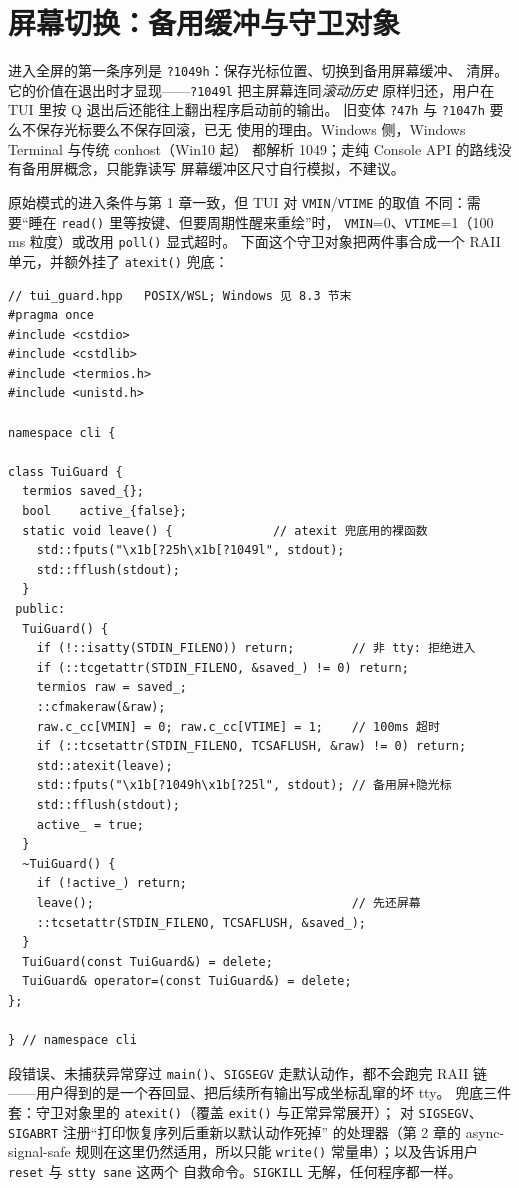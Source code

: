 \documentclass[12pt,a4paper,fontset=fandol]{ctexbook}
\newcommand{\Fn}[1]{\texttt{#1()}}
\newcommand{\Tp}[1]{\texttt{#1}}
\newcommand{\Bk}{\allowbreak}
\begin{document}
\section{屏幕切换：备用缓冲与守卫对象}

进入全屏的第一条序列是 \Tp{?1049h}：保存光标位置、切换到备用屏幕缓冲、
清屏。它的价值在退出时才显现——\Tp{?1049l} 把主屏幕连同\emph{滚动历史}
原样归还，用户在 TUI 里按 Q 退出后还能往上翻出程序启动前的输出。
旧变体 \Tp{?47h} 与 \Tp{?1047h} 要么不保存光标要么不保存回滚，已无
使用的理由。Windows 侧，Windows Terminal 与传统 conhost（Win10 起）
都解析 1049；走纯 Console API 的路线没有备用屏概念，只能靠读写
屏幕缓冲区尺寸自行模拟，不建议。

原始模式的进入条件与第 1 章一致，但 TUI 对 \Tp{VMIN}/{\Bk}\Tp{VTIME} 的取值
不同：需要``睡在 \Fn{read} 里等按键、但要周期性醒来重绘''时，
\Tp{VMIN}=0、\Tp{VTIME}=1（100 ms 粒度）或改用 \Fn{poll} 显式超时。
下面这个守卫对象把两件事合成一个 RAII 单元，并额外挂了 \Fn{atexit}
兜底：

\begin{lstlisting}[caption={备用屏与原始模式的进入/退出守卫（tui\_guard.hpp）}]
// tui_guard.hpp   POSIX/WSL; Windows 见 8.3 节末
#pragma once
#include <cstdio>
#include <cstdlib>
#include <termios.h>
#include <unistd.h>

namespace cli {

class TuiGuard {
  termios saved_{};
  bool    active_{false};
  static void leave() {              // atexit 兜底用的裸函数
    std::fputs("\x1b[?25h\x1b[?1049l", stdout);
    std::fflush(stdout);
  }
 public:
  TuiGuard() {
    if (!::isatty(STDIN_FILENO)) return;        // 非 tty: 拒绝进入
    if (::tcgetattr(STDIN_FILENO, &saved_) != 0) return;
    termios raw = saved_;
    ::cfmakeraw(&raw);
    raw.c_cc[VMIN] = 0; raw.c_cc[VTIME] = 1;    // 100ms 超时
    if (::tcsetattr(STDIN_FILENO, TCSAFLUSH, &raw) != 0) return;
    std::atexit(leave);
    std::fputs("\x1b[?1049h\x1b[?25l", stdout); // 备用屏+隐光标
    std::fflush(stdout);
    active_ = true;
  }
  ~TuiGuard() {
    if (!active_) return;
    leave();                                    // 先还屏幕
    ::tcsetattr(STDIN_FILENO, TCSAFLUSH, &saved_);
  }
  TuiGuard(const TuiGuard&) = delete;
  TuiGuard& operator=(const TuiGuard&) = delete;
};

} // namespace cli
\end{lstlisting}

\begin{warning}[title={崩溃不会执行析构，终端却已经坏了}]
段错误、未捕获异常穿过 \Fn{main}、\Tp{SIGSEGV} 走默认动作，都不会跑完
RAII 链——用户得到的是一个吞回显、把后续所有输出写成坐标乱窜的坏 tty。
兜底三件套：守卫对象里的 \Fn{atexit}（覆盖 \Fn{exit} 与正常异常展开）；
对 \Tp{SIGSEGV}、\Tp{SIGABRT} 注册``打印恢复序列后重新以默认动作死掉''
的处理器（第 2 章的 async-signal-safe 规则在这里仍然适用，所以只能
\Fn{write} 常量串）；以及告诉用户 \Tp{reset} 与 \Tp{stty sane} 这两个
自救命令。\Tp{SIGKILL} 无解，任何程序都一样。
\end{warning}
\end{document}
